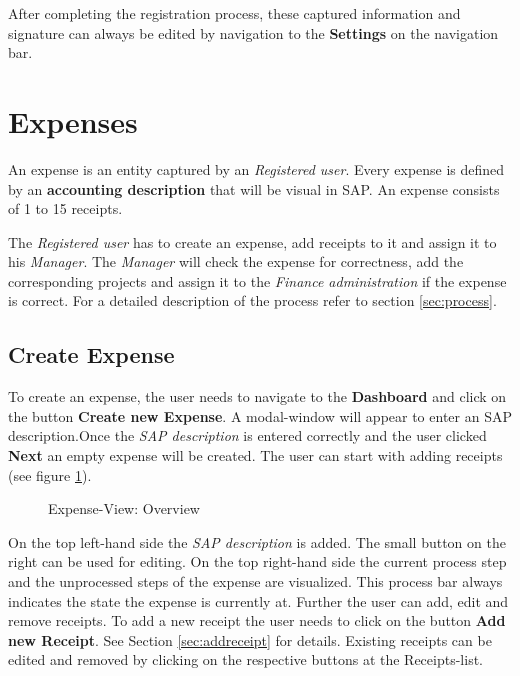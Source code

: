 After completing the registration process, these captured information and signature can always be edited by navigation to the \textbf{Settings} on the navigation bar.

\section{Expenses}

An expense is an entity captured by an \textit{Registered user}. Every expense is defined by an \textbf{accounting description} that will be visual in SAP. An expense consists of 1 to 15 receipts.

The \textit{Registered user} has to create an expense, add receipts to it and assign it to his \textit{Manager}. The \textit{Manager} will check the expense for correctness, add the corresponding projects and assign it to the \textit{Finance administration} if the expense is correct. For a detailed description of the process refer to section \ref{sec:process}.

\subsection{Create Expense}

To create an expense, the user needs to navigate to the \textbf{Dashboard} and click on the button \textbf{Create new Expense}. A modal-window will appear to enter an SAP description.\newline Once the \textit{SAP description} is entered correctly and the user clicked \textbf{Next} an empty expense will be created. The user can start with adding receipts (see figure \ref{fig:expensesitems-overview}).

\begin{figure}[H]
    \centering
    \caption{Expense-View: Overview}
    \label{fig:expensesitems-overview}
\end{figure}

On the top left-hand side the \textit{SAP description} is added. The small button on the right can be used for editing. On the top right-hand side the current process step and the unprocessed steps of the expense are visualized. This process bar always indicates the state the expense is currently at.\newline
Further the user can add, edit and remove receipts. To add a new receipt the user needs to click on the button \textbf{Add new Receipt}. See Section \ref{sec:addreceipt} for details.\newline
Existing receipts can be edited and removed by clicking on the respective buttons at the Receipts-list.


